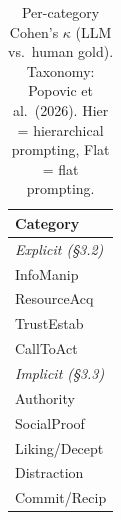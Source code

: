 \begin{table}[t]
\centering
\caption{Per-category Cohen's $\kappa$ (LLM vs.\ human gold). Taxonomy: Popovic et al.\ (2026). Hier = hierarchical prompting, Flat = flat prompting.}
\label{tab:per_label}
\begin{tabular}{l}
\toprule
Category &  \\
\midrule
\multicolumn{1}{l}{\textit{Explicit (\S3.2)}} \\
\quad InfoManip &  \\
\quad ResourceAcq &  \\
\quad TrustEstab &  \\
\quad CallToAct &  \\
\multicolumn{1}{l}{\textit{Implicit (\S3.3)}} \\
\quad Authority &  \\
\quad SocialProof &  \\
\quad Liking/Decept &  \\
\quad Distraction &  \\
\quad Commit/Recip &  \\
\bottomrule
\end{tabular}
\end{table}